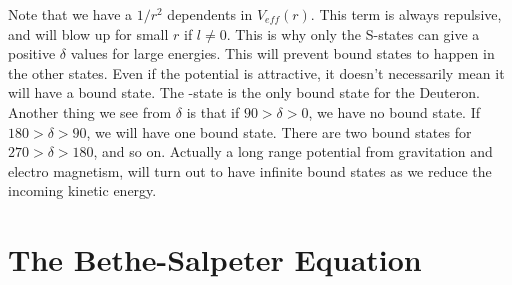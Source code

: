Note that we have a $1/r^2$ dependents in $V_{eff}(r)$. This term is always repulsive, and will blow up for small $r$ if $l\ne0$.  
This is why only the S-states can give a positive $\delta$ values for large energies. This will prevent bound states to happen
in the other states. 
Even if the potential is attractive, it 
doesn't necessarily mean it will have a bound state. The -state is the only bound state for the Deuteron.
\nl
Another thing we see from $\delta$ is that if $90>\delta>0$, we have no bound state.
If $180>\delta>90$, we  will have one bound state. There are two bound states for $270>\delta>180$, and so on. Actually a 
long range potential from gravitation and electro magnetism, will turn out to have infinite bound states as 
we reduce the incoming kinetic energy.








\section{The Bethe-Salpeter Equation} 

